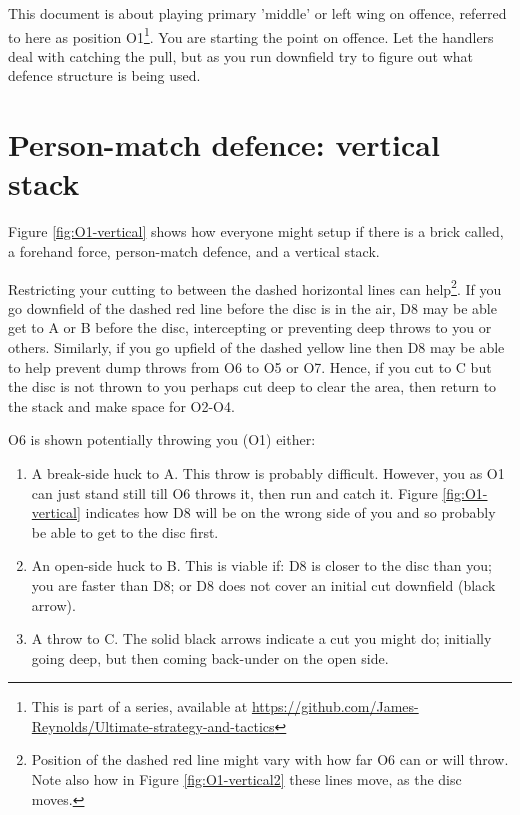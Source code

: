 \documentclass{tufte-handout}
\begin{document}
This document is about 
playing primary 'middle' 
or left wing 
on offence,
referred to here 
as position O1\footnote{This
is part of a series, 
available at
\url{https://github.com/James-Reynolds/Ultimate-strategy-and-tactics}}.
You are starting the point on offence. 
Let the handlers 
deal with catching the pull, but
as you run downfield
try to figure out 
what defence structure
is being used. 

\section{Person-match defence: vertical stack}\label{sec:vertical}

Figure \ref{fig:O1-vertical} shows 
how everyone might 
setup 
if there is a brick called,
a forehand force, 
person-match defence, 
and a vertical stack.


Restricting your cutting 
to between 
the dashed 
horizontal 
lines 
can help\footnote{
Position of 
the dashed red line might vary
with how far O6 
can or will 
throw. 
Note also how in 
Figure \ref{fig:O1-vertical2} 
these lines move, 
as the disc moves.}. 
If you go 
downfield of the dashed red line 
before the disc is in the air,
D8 may be able 
get to
A or B 
before the disc,
intercepting 
or preventing 
deep throws to 
you or others. 
Similarly, 
if you go 
upfield of the dashed yellow line
then D8 may 
be able to help
prevent dump throws from O6
to O5 
or O7.
Hence,
if you cut to C
but the disc is not thrown to you
perhaps cut deep 
to clear the area, 
then return to the stack
and make space for O2-O4. 


O6 is shown
potentially throwing 
you (O1) either:
\begin{enumerate}
\item A break-side 
huck to A.
This throw is 
probably 
difficult. 
However, you as O1
can just
stand still 
till O6 throws it, 
then run and catch it.
Figure \ref{fig:O1-vertical} indicates how 
D8 will be on the wrong side of you
and so probably 
be able to get to the disc
first.
\item An open-side huck to B. 
This is viable if: 
D8 is closer to the disc than you; 
you are faster than D8; or 
D8 does not cover 
an initial cut downfield (black arrow). 
\item A throw 
to C.
The solid black arrows indicate 
a cut you might do;
initially going deep,
but then coming back-under
on the open side.
\end{enumerate}
\end{document}
